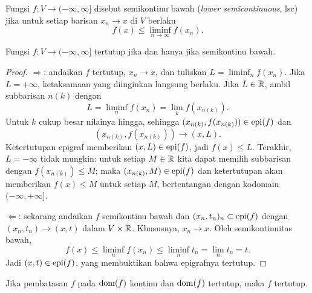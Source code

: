 \begin{defn}
    Fungsi $f:V\rightarrow(-\infty,\infty]$ disebut semikontinu bawah
    (\emph{lower semicontinuous}, lsc) jika untuk setiap barisan
    $x_n\rightarrow x$ di $V$ berlaku
    \begin{equation}
        f(x)\leq\liminf_{n\rightarrow\infty}f(x_n).
    \end{equation}
\end{defn}

\begin{lemma}
    Fungsi $f:V\rightarrow(-\infty,\infty]$ tertutup jika dan hanya jika
    semikontinu bawah.
\end{lemma}

\begin{proof}
    $\Rightarrow$: andaikan $f$ tertutup, $x_n\rightarrow x$, dan tuliskan
    $L=\liminf_n f(x_n)$. Jika $L=+\infty$, ketaksamaan yang diinginkan langsung
    berlaku. Jika $L\in\mathbb{R}$, ambil subbarisan $n(k)$ dengan
    \begin{equation}
        L=\liminf_n f(x_n)=\lim_k f(x_{n(k)}).
    \end{equation}
    Untuk $k$ cukup besar nilainya hingga, sehingga
    $(x_{n(k)},f(x_{n(k)}))\in\operatorname{\mathrm{epi}}(f)$ dan
    \begin{equation}
        (x_{n(k)},f(x_{n(k)}))\longrightarrow(x,L).
    \end{equation}
    Ketertutupan epigraf memberikan $(x,L)\in\operatorname{\mathrm{epi}}(f)$, jadi $f(x)\leq L$.
    Terakhir, $L=-\infty$ tidak mungkin: untuk setiap $M\in\mathbb{R}$ kita dapat
    memilih subbarisan dengan $f(x_{n(k)})\leq M$; maka
    $(x_{n(k)},M)\in\operatorname{\mathrm{epi}}(f)$ dan ketertutupan akan memberikan $f(x)\leq M$
    untuk setiap $M$, bertentangan dengan kodomain $(-\infty,+\infty]$.

    $\Leftarrow$: sekarang andaikan $f$ semikontinu bawah dan
    $(x_n,t_n)_n\subset\operatorname{\mathrm{epi}}(f)$ dengan $(x_n,t_n)\rightarrow(x,t)$ dalam
    $V\times\mathbb{R}$. Khususnya, $x_n\rightarrow x$. Oleh semikontinuitas bawah,
    \begin{equation}
        f(x)\leq\liminf_n f(x_n)
        \leq\liminf_n t_n=\lim_n t_n=t.
    \end{equation}
    Jadi $(x,t)\in\operatorname{\mathrm{epi}}(f)$, yang membuktikan bahwa epigrafnya tertutup.
\end{proof}

\begin{lemma}
    Jika pembatasan $f$ pada $\operatorname{\mathrm{dom}}(f)$ kontinu dan $\operatorname{\mathrm{dom}}(f)$ tertutup, maka
    $f$ tertutup.
\end{lemma}

